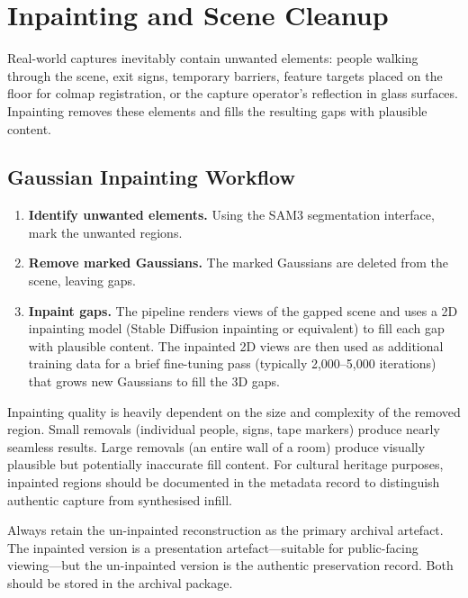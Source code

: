 \section{Inpainting and Scene Cleanup}
\label{sec:adv-inpainting}

Real-world captures inevitably contain unwanted elements: people walking through the scene, exit signs, temporary barriers, feature targets placed on the floor for \acrshort{colmap} registration, or the capture operator's reflection in glass surfaces. Inpainting removes these elements and fills the resulting gaps with plausible content.

\subsection{Gaussian Inpainting Workflow}

\begin{enumerate}
  \item \textbf{Identify unwanted elements.} Using the SAM3 segmentation interface, mark the unwanted regions.
  \item \textbf{Remove marked Gaussians.} The marked Gaussians are deleted from the scene, leaving gaps.
  \item \textbf{Inpaint gaps.} The pipeline renders views of the gapped scene and uses a 2D inpainting model (Stable Diffusion inpainting or equivalent) to fill each gap with plausible content. The inpainted 2D views are then used as additional training data for a brief fine-tuning pass (typically 2,000--5,000 iterations) that grows new Gaussians to fill the 3D gaps.
\end{enumerate}

\begin{keyfinding}
Inpainting quality is heavily dependent on the size and complexity of the removed region. Small removals (individual people, signs, tape markers) produce nearly seamless results. Large removals (an entire wall of a room) produce visually plausible but potentially inaccurate fill content. For cultural heritage purposes, inpainted regions should be documented in the metadata record to distinguish authentic capture from synthesised infill.
\end{keyfinding}

\begin{recommendation}
Always retain the un-inpainted reconstruction as the primary archival artefact. The inpainted version is a presentation artefact---suitable for public-facing viewing---but the un-inpainted version is the authentic preservation record. Both should be stored in the archival package.
\end{recommendation}

